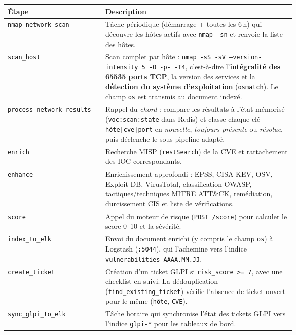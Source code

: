 \documentclass[11pt,a4paper]{article}
\begin{document}
\begin{center}
\small
\begin{longtable}{@{}l >{\raggedright\arraybackslash}p{0.66\linewidth}@{}}
\toprule
\textbf{\'Etape} & \textbf{Description} \\
\midrule
\endhead
\bottomrule
\endlastfoot
\texttt{nmap\_network\_scan} & T\^ache p\'eriodique (d\'emarrage + toutes les
6\,h) qui d\'ecouvre les h\^otes actifs avec \texttt{nmap -sn} et renvoie la
liste des h\^otes. \\
\texttt{scan\_host} & Scan complet par h\^ote : \texttt{nmap -sS -sV
--version-intensity 5 -O -p- -T4}, c'est-\`a-dire l'\textbf{int\'egralit\'e
des 65535 ports TCP}, la version des services et la \textbf{d\'etection du
syst\`eme d'exploitation} (\texttt{osmatch}). Le champ \texttt{os} est
transmis au document index\'e. \\
\texttt{process\_network\_results} & Rappel du \emph{chord} : compare les
r\'esultats \`a l'\'etat m\'emoris\'e (\texttt{voc:scan:state} dans Redis) et
classe chaque cl\'e \texttt{h\^ote|cve|port} en \emph{nouvelle},
\emph{toujours pr\'esente} ou \emph{r\'esolue}, puis d\'eclenche le
sous-pipeline adapt\'e. \\
\texttt{enrich} & Recherche MISP (\texttt{restSearch}) de la CVE et
rattachement des IOC correspondants. \\
\texttt{enhance} & Enrichissement approfondi : EPSS, CISA KEV, OSV,
Exploit-DB, VirusTotal, classification OWASP, tactiques/techniques MITRE
ATT\&CK, rem\'ediation, durcissement CIS et liste de v\'erifications. \\
\texttt{score} & Appel du moteur de risque (\texttt{POST /score}) pour
calculer le score 0--10 et la s\'ev\'erit\'e. \\
\texttt{index\_to\_elk} & Envoi du document enrichi (y compris le champ
\texttt{os}) \`a Logstash (\texttt{:5044}), qui l'achemine vers l'indice
\texttt{vulnerabilities-AAAA.MM.JJ}. \\
\texttt{create\_ticket} & Cr\'eation d'un ticket GLPI si
\texttt{risk\_score >= 7}, avec une checklist en suivi. La d\'edouplication
(\texttt{find\_existing\_ticket}) v\'erifie l'absence de ticket ouvert pour
le m\^eme (\texttt{h\^ote}, \texttt{CVE}). \\
\texttt{sync\_glpi\_to\_elk} & T\^ache horaire qui synchronise l'\'etat des
tickets GLPI vers l'indice \texttt{glpi-*} pour les tableaux de bord. \\
\bottomrule
\end{longtable}
\end{center}
\end{document}
